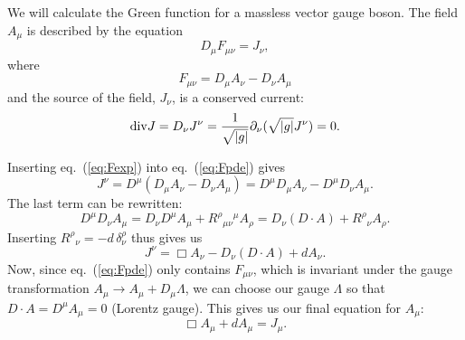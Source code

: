 We will calculate the Green function for a massless vector gauge boson. The field $A_\mu$ is described by the equation
\begin{equation}\label{eq:Fpde}
D_\mu F_{\mu\nu} = J_\nu,
\end{equation}
where 
\begin{equation}\label{eq:Fexp}
F_{\mu\nu}=D_\mu A_\nu - D_\nu A_\mu
\end{equation}
and the source of the field, $J_\nu$, is a conserved current:
\begin{equation}\label{eq:Jcons}
\mathrm{div} J = D_\nu J^\nu = \frac{1}{\sqrt{|g|}} \partial_\nu (\sqrt{|g|} J^\nu) = 0.
\end{equation}

Inserting eq.~(\ref{eq:Fexp}) into eq.~(\ref{eq:Fpde}) gives
$$J^\nu = D^\mu \left( D_\mu A_\nu - D_\nu A_\mu \right) = D^\mu D_\mu A_\nu - D^\mu D_\nu A_\mu.$$
The last term can be rewritten:
$$D^\mu D_\nu A_\mu = D_\nu D^\mu A_\mu + R^\rho{}_{\mu\nu}{}^\mu A_\rho = D_\nu (D \cdot A) + R^\rho{}_\nu A_\rho.$$
Inserting $R^\rho{}_\nu = -d\, \delta_\nu^\rho$ thus gives us
$$J^\nu = \Box A_\nu - D_\nu (D \cdot A) + d A_\nu.$$
Now, since eq.~(\ref{eq:Fpde}) only contains $F_{\mu\nu}$, which is invariant under the gauge transformation $A_\mu \to A_\mu + D_\mu \Lambda$, we can choose our gauge $\Lambda$ so that $D \cdot A = D^\mu A_\mu = 0$ (Lorentz gauge). This gives us our final equation for $A_\mu$:
\begin{equation}\label{eq:Apde}
\Box A_\mu + d A_\mu = J_\mu.
\end{equation}

